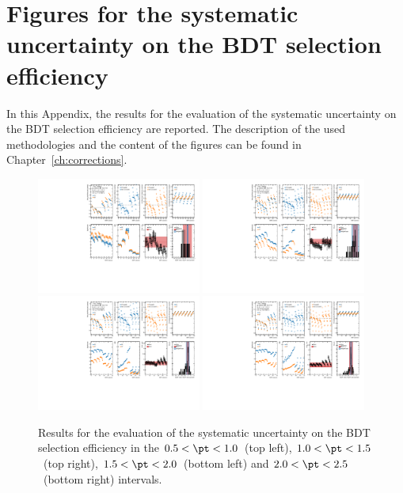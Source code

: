 \chapter[Figures for the systematic uncertainty on the BDT selection efficiency]{Figures for the systematic\\uncertainty on the BDT selection\\ efficiency}\label{app:fpdpl}
In this Appendix, the results for the evaluation of the systematic uncertainty on the BDT selection efficiency are reported. The description of the used methodologies and the content of the figures can be found in Chapter~\ref{ch:corrections}.

\begin{figure}
    \centering
    \includegraphics[width=0.48\textwidth]{Figures/Chapter 6/AllSystBDT/BDTsyst0.pdf}
    \includegraphics[width=0.48\textwidth]{Figures/Chapter 6/AllSystBDT/BDTsyst1.pdf}
    \includegraphics[width=0.48\textwidth]{Figures/Chapter 6/AllSystBDT/BDTsyst2.pdf}
    \includegraphics[width=0.48\textwidth]{Figures/Chapter 6/AllSystBDT/BDTsyst3.pdf}
    \caption{Results for the evaluation of the systematic uncertainty on the BDT selection efficiency in the $0.5 < \pt < 1.0$~\gevc (top left), $1.0 < \pt < 1.5$~\gevc (top right), $1.5 < \pt < 2.0$~\gevc (bottom left) and $2.0 < \pt < 2.5$~\gevc (bottom right) intervals.}
\end{figure}

